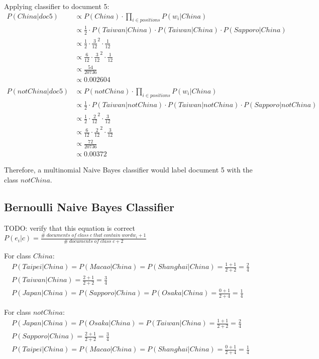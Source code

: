 \documentclass{article}
\begin{document}
Applying classifier to document 5:
\begin{align}
	P(China|doc5) & \propto P(China) \cdot \prod_{i \in positions} {P(w_i|China)} \\
	& \propto \frac{1}{2} \cdot P(Taiwan|China) \cdot P(Taiwan|China) \cdot P(Sapporo|China) \\
	& \propto \frac{1}{2} \cdot \frac{3}{12}^2 \cdot \frac{1}{12} \\
	& \propto \frac{6}{12} \cdot \frac{3}{12}^2 \cdot \frac{1}{12} \\
	& \propto \frac{54}{20736} \\
	& \propto 0.002604 \\
	& \nonumber \\ 
	P(notChina|doc5) & \propto P(notChina) \cdot \prod_{i \in positions} {P(w_i|China)} \\
	& \propto \frac{1}{2} \cdot P(Taiwan|notChina) \cdot P(Taiwan|notChina) \cdot P(Sapporo|notChina) \\
	& \propto \frac{1}{2} \cdot \frac{2}{12}^2 \cdot \frac{3}{12} \\
	& \propto \frac{6}{12} \cdot \frac{2}{12}^2 \cdot \frac{3}{12} \\	
	& \propto \frac{72}{20736} \\
	& \propto 0.00372
\end{align}

Therefore, a multinomial Naive Bayes classifier would label document 5 with the class $notChina$.

\subsection{Bernoulli Naive Bayes Classifier}

TODO: verify that this equation is correct
$P(e_i|c) = \frac{\#\;documents\;of\;class\;c\;that\;contain\;word w_i + 1}{\#\;documents\;of\;class\;c + 2}$

For class $China$:
\begin{align}
P(Taipei|China) = P(Macao|China) = P(Shanghai|China) = \frac{1 + 1}{2 + 2} = \frac{2}{4} \\
P(Taiwan|China) = \frac{2 + 1}{2 + 2} = \frac{3}{4} \\
P(Japan|China) = P(Sapporo|China) = P(Osaka|China) = \frac{0 + 1}{2 + 4} = \frac{1}{4}
\end{align}

For class $notChina$:
\begin{align}
P(Japan|China) = P(Osaka|China) = P(Taiwan|China) = \frac{1 + 1}{2 + 2} = \frac{2}{4} \\
P(Sapporo|China) = \frac{2 + 1}{2 + 2} = \frac{3}{4} \\
P(Taipei|China) = P(Macao|China) = P(Shanghai|China) = \frac{0 + 1}{2 + 4} = \frac{1}{4}
\end{align}
\end{document}
